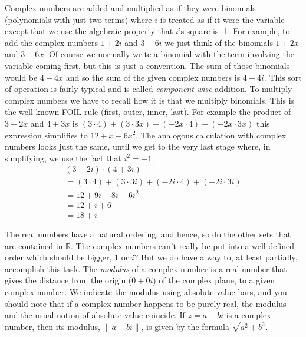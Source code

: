 \documentclass[10pt,]{book}
\theoremstyle{plain}
\theoremstyle{definition}
\theoremstyle{definition}
\numberwithin{equation}{section}
\newcommand{\Reals}{{\mathbb R}}
\begin{document}
    Complex numbers are added and multiplied as if they were binomials
    (polynomials with just two terms) where \(i\) is treated as if it were
    the variable \textemdash{} except that we use the algebraic property that \(i\)'s
    square is -1. For example, to add the complex numbers \(1+2i\) and
    \(3-6i\) we just think of the binomials \(1+2x\) and \(3-6x\). Of course we
    normally write a binomial with the term involving the variable coming
    first, but this is just a convention. The sum of those binomials
    would be \(4-4x\) and so the sum of the given complex numbers is \(4-4i\).
    This sort of operation is fairly typical and is called
    \emph{component-wise} addition.
    To multiply complex numbers we have to
    recall how it is that we multiply binomials. This is the well-known
    FOIL rule (first, outer, inner, last). For example the product of
    \(3-2x\) and \(4+3x\) is \((3\cdot 4) + (3 \cdot 3x) + (-2x\cdot 4) +
    (-2x\cdot 3x)\) this expression simplifies to \(12 + x - 6x^2\). The
    analogous calculation with complex numbers looks just the same, until
    we get to the very last stage where, in simplifying, we use the fact
    that \(i^2=-1\).
    \begin{gather*}
(3-2i)\cdot (4+3i)\\
= (3\cdot 4) + (3\cdot 3i) + (-2i\cdot 4) + (-2i\cdot 3i)\\
= 12 + 9i - 8i -6i^2\\
= 12 + i + 6\\
= 18 + i
\end{gather*}
\par

    The real numbers have a natural ordering, and hence, so do the
    other sets that are contained in \(\Reals\). The complex numbers
    can't really be put into a well-defined order \textemdash{} which should be
    bigger, \(1\) or \(i\)? But we do have a way to, at least partially,
    accomplish this task. The 
    \emph{modulus} of a complex number is a real number that gives the
    distance from the origin (\(0+0i\)) of the complex plane, to a given
    complex number. We indicate the modulus using absolute value bars,
    and you should note that if a complex number happens to be purely
    real, the modulus and the usual notion of absolute value coincide.
    If \(z = a + bi\) is a complex number, then its modulus, \(\|a + bi \|\),
    is given by the formula \(\sqrt{a^2+b^2}\).
\par
\end{document}
